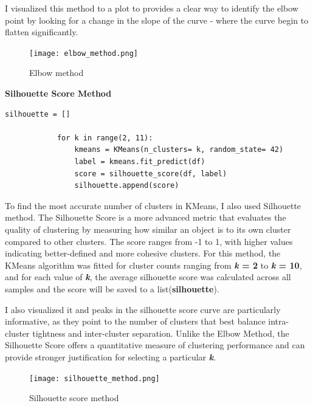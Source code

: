 \documentclass[a4paper,12pt]{article}
\begin{document}
\begin{itemize}[label= {*}, leftmargin= 1cm]
\begin{itemize}[label= {}, leftmargin= 1cm]
        I visualized this method to a plot to provides a clear way to identify the elbow point by looking for a change in the slope of the curve - where the curve begin to flatten significantly.
        
        \begin{figure}[h]
            \centering
            \texttt{[image: elbow\_method.png]}
            \caption{Elbow method}
        \end{figure}
        
        \vspace{0.5cm}

        \textbf{Silhouette Score Method}
        \begin{Verbatim}[xleftmargin=-1cm]
            silhouette = []

            for k in range(2, 11):
                kmeans = KMeans(n_clusters= k, random_state= 42)
                label = kmeans.fit_predict(df)
                score = silhouette_score(df, label)
                silhouette.append(score)
        \end{Verbatim}  
        \vspace{0.3cm}
        
        To find the most accurate number of clusters in KMeans, I also used Silhouette method. The Silhouette Score is a more advanced metric that evaluates the quality of clustering by measuring how similar an object is to its own cluster compared to other clusters. The score ranges from -1 to 1, with higher values indicating better-defined and more cohesive clusters. For this method, the KMeans algorithm was fitted for cluster counts ranging from \textbf{\textit{k} = 2} to \textbf{\textit{k} = 10}, and for each value of \textbf{\textit{k}}, the average silhouette score was calculated across all samples and the score will be saved to a list(\textbf{silhouette}).
        \vspace{0.3cm}
        
        I also visualized it and peaks in the silhouette score curve are particularly informative, as they point to the number of clusters that best balance intra-cluster tightness and inter-cluster separation. Unlike the Elbow Method, the Silhouette Score offers a quantitative measure of clustering performance and can provide stronger justification for selecting a particular \textbf{\textit{k}}.

        \begin{figure}[h]
            \centering
            \texttt{[image: silhouette\_method.png]}
            \caption{Silhouette score method}
        \end{figure}
        

\end{itemize}
\end{itemize}
\end{document}
